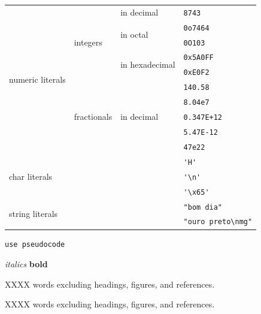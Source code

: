 \documentclass[11pt]{article} %
\begin{document}
\begin{tabular}{|l|l|l|l|}\hline
  \multirow{10}{*}{numeric literals} 				& \multirow{5}{*}{integers} 	& in decimal 					& \verb|8743| \\ \cline{3-4}
  					    				& 				       	& \multirow{2}{*}{in octal}   		& \verb|0o7464| \\ \cline{4-4}
  					    				& 					& 						& \verb|0O103| \\ \cline{3-4}
  					    				& 					& \multirow{2}{*}{in hexadecimal}	& \verb|0x5A0FF| \\ \cline{4-4}
 				 	    				& 					& 						& \verb|0xE0F2| \\ \cline{2-4}
  					    				& \multirow{5}{*}{fractionals} 	& \multirow{5}{*}{in decimal} 		& \verb|140.58| \\ \cline{4-4}
 				 					& 					& 						& \verb|8.04e7| \\ \cline{4-4}
  									& 					& 						& \verb|0.347E+12| \\ \cline{4-4}
  									& 					& 						& \verb|5.47E-12| \\ \cline{4-4}
  									& 					& 						& \verb|47e22| \\ \cline{1-4}
  \multicolumn{3}{|l|}{\multirow{3}{*}{char literals}} 													& \verb|'H'| \\ \cline{4-4}
  \multicolumn{3}{|l|}{} 																	& \verb|'\n'| \\ \cline{4-4}          %
  \multicolumn{3}{|l|}{} 																	& \verb|'\x65'| \\ \cline{1-4}        %
  \multicolumn{3}{|l|}{\multirow{2}{*}{string literals}} 												& \verb|"bom dia"| \\ \cline{4-4}
  \multicolumn{3}{|l|}{} 																	& \verb|"ouro preto\nmg"| \\ \cline{1-4}          %
\end{tabular}




\begin{verbatim}
use pseudocode
\end{verbatim}

\textit{italics}
\textbf{bold}

XXXX words excluding headings, figures, and references. \\

%
%
%




\medskip 

XXXX words excluding headings, figures, and references. \\
\pagebreak
\printbibliography
\end{document}
